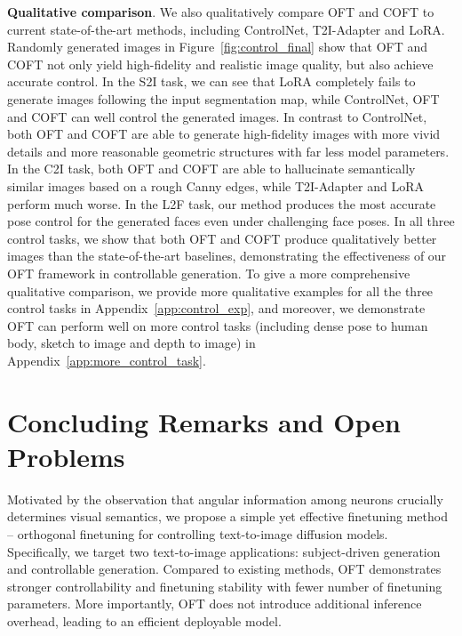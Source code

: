 \textbf{Qualitative comparison}. We also qualitatively compare OFT and COFT to current state-of-the-art methods, including ControlNet, T2I-Adapter and LoRA. Randomly generated images in Figure~\ref{fig:control_final} show that OFT and COFT not only yield high-fidelity and realistic image quality, but also achieve accurate control. In the S2I task, we can see that LoRA completely fails to generate images following the input segmentation map, while ControlNet, OFT and COFT can well control the generated images. In contrast to ControlNet, both OFT and COFT are able to generate high-fidelity images with more vivid details and more reasonable geometric structures with far less model parameters. In the C2I task, both OFT and COFT are able to hallucinate semantically similar images based on a rough Canny edges, while T2I-Adapter and LoRA perform much worse. In the L2F task, our method produces the most accurate pose control for the generated faces even under challenging face poses. In all three control tasks, we show that both OFT and COFT produce qualitatively better images than the state-of-the-art baselines, demonstrating the effectiveness of our OFT framework in controllable generation. To give a more comprehensive qualitative comparison, we provide more qualitative examples for all the three control tasks in Appendix~\ref{app:control_exp}, and moreover, we demonstrate OFT can perform well on more control tasks (including dense pose to human body, sketch to image and depth to image) in Appendix~\ref{app:more_control_task}.

\vspace{-2mm}
\section{Concluding Remarks and Open Problems}
\vspace{-1.5mm}


Motivated by the observation that angular information among neurons crucially determines visual semantics, we propose a simple yet effective finetuning method – orthogonal finetuning for controlling text-to-image diffusion models. Specifically, we target two text-to-image applications: subject-driven generation and controllable generation. Compared to existing methods, OFT demonstrates stronger controllability and finetuning stability with fewer number of finetuning parameters. More importantly, OFT does not introduce additional inference overhead, leading to an efficient deployable model.

